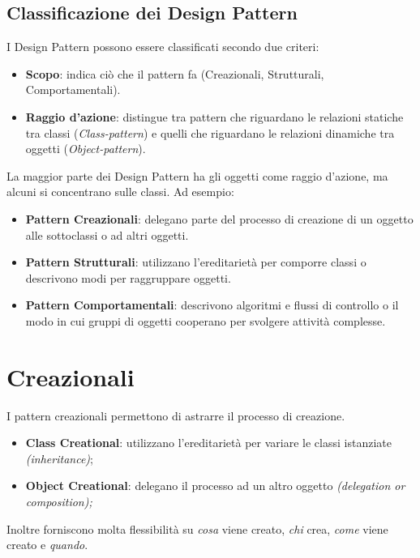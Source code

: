 \subsection{Classificazione dei Design Pattern}
I Design Pattern possono essere classificati secondo due criteri:
\begin{itemize}
    \item \textbf{Scopo}: indica ciò che il pattern fa (Creazionali, Strutturali, Comportamentali).
    \item \textbf{Raggio d’azione}: distingue tra pattern che riguardano le relazioni statiche tra classi (\textit{Class-pattern}) e quelli che riguardano le relazioni dinamiche tra oggetti (\textit{Object-pattern}).
\end{itemize}

La maggior parte dei Design Pattern ha gli oggetti come raggio d’azione, ma alcuni si concentrano sulle classi. Ad esempio:
\begin{itemize}
    \item \textbf{Pattern Creazionali}: delegano parte del processo di creazione di un oggetto alle sottoclassi o ad altri oggetti.
    \item \textbf{Pattern Strutturali}: utilizzano l’ereditarietà per comporre classi o descrivono modi per raggruppare oggetti.
    \item \textbf{Pattern Comportamentali}: descrivono algoritmi e flussi di controllo o il modo in cui gruppi di oggetti cooperano per svolgere attività complesse.
\end{itemize}

\newpage

\section{Creazionali}

I pattern creazionali permettono di astrarre il processo di creazione. 
\begin{itemize}
    \item \textbf{Class Creational}: utilizzano l'ereditarietà per variare le classi istanziate \textit{(inheritance)};
    \item \textbf{Object Creational}: delegano il processo ad un altro oggetto \textit{(delegation or composition);}
\end{itemize}
Inoltre forniscono molta flessibilità su \textit{cosa} viene creato, \textit{chi} crea, \textit{come} viene creato e \textit{quando}.







